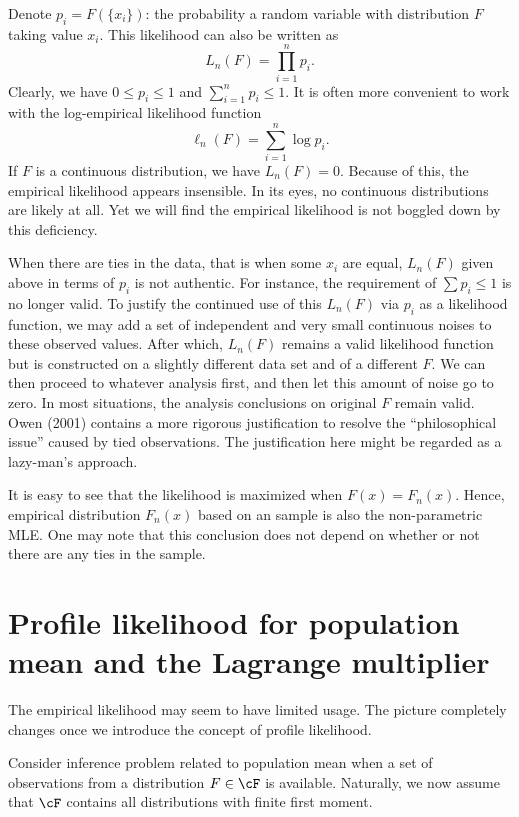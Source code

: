 Denote $p_i = F(\{x_i\})$: the probability a random variable
with distribution $F$ taking value $x_i$. 
This likelihood can also be written as
\[
L_n(F) = \prod_{i=1}^n p_i.
\]
Clearly, we have $0 \leq p_i \leq 1$ and $\sum_{i=1}^n p_i  \leq 1$.
It is often more convenient to work with the log-empirical likelihood function
\[
\ell_n(F) = \sum_{i=1}^n \log p_i.
\]
If $F$ is a continuous distribution, we have $L_n(F) =0$.
Because of this, the empirical likelihood appears insensible. 
In its eyes, no continuous distributions are likely at all.
Yet we will find the empirical likelihood is not boggled down by
this deficiency. 

When there are ties in the data, that is when some $x_i$ are equal, 
$L_n(F)$ given above in terms of $p_i$ is not authentic. 
For instance, the requirement of $\sum p_i \leq 1$ is no longer valid.
To justify the continued use of this $L_n(F)$ via $p_i$ as a likelihood function, 
we may add a set of independent and very small continuous noises 
to these observed values. 
After which, $L_n(F)$ remains a valid likelihood function but is constructed
on a slightly different data set and of a different $F$.
We can then proceed to whatever analysis first, 
and then let this amount of noise go to zero. 
In most situations, the analysis conclusions on original $F$
remain valid. Owen (2001) contains a more rigorous 
justification to resolve the ``philosophical issue'' caused by
tied observations. The justification here might be regarded
as a lazy-man's approach.

It is easy to see that the likelihood is maximized when 
$F(x) = F_n(x)$. Hence, empirical distribution
$F_n(x)$ based on an \iid sample is also the non-parametric MLE. 
One may note that this conclusion does not depend on 
whether or not there are any ties in the sample.

\section[profile likelihood]{Profile likelihood for population mean and the Lagrange multiplier}

The empirical likelihood may seem to have limited usage. 
The picture completely changes once we introduce the concept
of profile likelihood.

Consider inference problem related to population mean when a
set of \iid observations from a distribution $F \in \cF$ is available.
Naturally, we now assume that $\cF$ contains all distributions with
finite first moment. 

